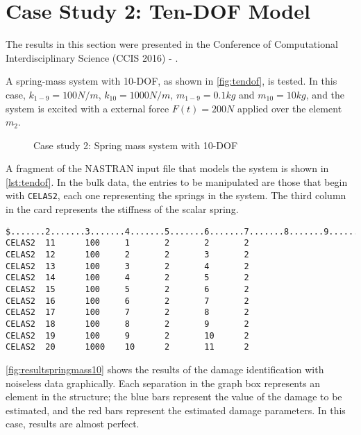 \section{Case Study 2: Ten-DOF Model}
\label{sec:tendof}

The results in this section were presented in the Conference of Computational Interdisciplinary Science (CCIS 2016) - \cite{hernandez2016ccis}.

A spring-mass system with 10-DOF, as shown in  \autoref{fig:tendof}, is tested. In this case, $k_{1-9} = 100 N/m$, $k_{10} = 1000 N/m$, $m_{1-9} = 0.1kg$ and $m_{10} = 10kg$, and the system is excited with a external force $F(t) = 200N$ applied over the element $m_2$.

\begin{figure}[H]
\caption{Case study 2: Spring mass system with 10-DOF}
\label{fig:tendof}
\centering
{}
\end{figure}

A fragment of the NASTRAN input file that models the system is shown in \autoref{lst:tendof}. In the bulk data, the entries to be manipulated are those that begin with \texttt{CELAS2}, each one representing the springs in the system. The third column in the card represents the stiffness of the scalar spring.

\begin{lstlisting}[caption={NASTRAN input file for Ten-DOF model},label={lst:tendof}]
$.......2.......3.......4.......5.......6.......7.......8.......9.......10.....$
CELAS2  11      100     1       2       2       2
CELAS2  12      100     2       2       3       2
CELAS2  13      100     3       2       4       2
CELAS2  14      100     4       2       5       2
CELAS2  15      100     5       2       6       2
CELAS2  16      100     6       2       7       2
CELAS2  17      100     7       2       8       2
CELAS2  18      100     8       2       9       2
CELAS2  19      100     9       2       10      2
CELAS2  20      1000    10      2       11      2                                   \end{lstlisting}

\autoref{fig:resultspringmass10} shows the results of the damage identification with noiseless data graphically. Each separation in the graph box represents an element in the structure; the blue bars represent the value of the damage to be estimated, and the red bars represent the estimated damage parameters. In this case, results are almost perfect.

